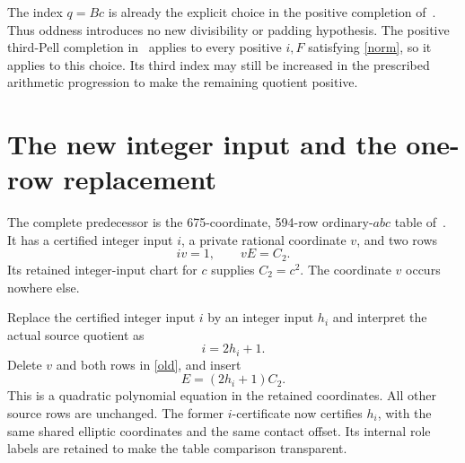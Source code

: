 \documentclass[11pt]{article}
\begin{document}
The index \(q=Bc\) is already the explicit choice in the positive
completion of~\cite{Binomial}. Thus oddness introduces no new
divisibility or padding hypothesis. The positive third-Pell completion
in~\cite[Proposition 3]{CRT} applies to every positive \(i,F\)
satisfying \eqref{norm}, so it applies to this choice. Its third index
may still be increased in the prescribed arithmetic progression to make
the remaining quotient positive.

\section{The new integer input and the one-row replacement}

The complete predecessor is the 675-coordinate, 594-row
ordinary-\(abc\) table of~\cite{Common}. It has a certified
integer input \(i\), a private rational coordinate \(v\), and
two rows
\begin{equation}\label{old}
                         iv=1,\qquad vE=C_2.
\end{equation}
Its retained integer-input chart for \(c\) supplies \(C_2=c^2\).
The coordinate \(v\) occurs nowhere else.

Replace the certified integer input \(i\) by an integer input \(h_i\)
and interpret the actual source quotient as
\begin{equation}\label{new-i}
                              i=2h_i+1.
\end{equation}
Delete \(v\) and both rows in \eqref{old}, and insert
\begin{equation}\label{new}
                           E=(2h_i+1)C_2.
\end{equation}
This is a quadratic polynomial equation in the retained coordinates.
All other source rows are unchanged. The former \(i\)-certificate
now certifies \(h_i\), with the same shared elliptic coordinates and
the same contact offset. Its internal role labels are retained to make
the table comparison transparent.
\end{document}
